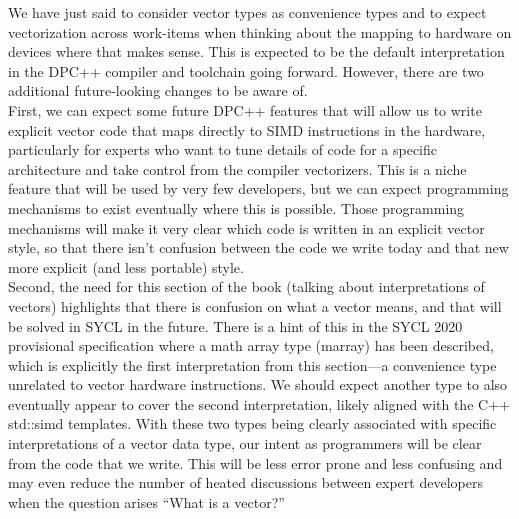 \begin{tcolorbox}[colback=blue!5!white,colframe=blue!75!black, title=CHANGES ARE ON THE HORIZON]
We have just said to consider vector types as convenience types and to expect vectorization across work-items when thinking about the mapping to hardware on devices where that makes sense. This is expected to be the default interpretation in the DPC++ compiler and toolchain going forward. However, there are two additional future-looking changes to be aware of.\\

First, we can expect some future DPC++ features that will allow us to write explicit vector code that maps directly to SIMD instructions in the hardware, particularly for experts who want to tune details of code for a specific architecture and take control from the compiler vectorizers. This is a niche feature that will be used by very few developers, but we can expect programming mechanisms to exist eventually where this is possible. Those programming mechanisms will make it very clear which code is written in an explicit vector style, so that there isn’t confusion between the code we write today and that new more explicit (and less portable) style.\\

Second, the need for this section of the book (talking about interpretations of vectors) highlights that there is confusion on what a vector means, and that will be solved in SYCL in the future. There is a hint of this in the SYCL 2020 provisional specification where a math array type (marray) has been described, which is explicitly the first interpretation from this section—a convenience type unrelated to vector hardware instructions. We should expect another type to also eventually appear to cover the second interpretation, likely aligned with the C++ std::simd templates. With these two types being clearly associated with specific interpretations of a vector data type, our intent as programmers will be clear from the code that we write. This will be less error prone and less confusing and may even reduce the number of heated discussions between expert developers when the question arises “What is a vector?”
\end{tcolorbox}

































